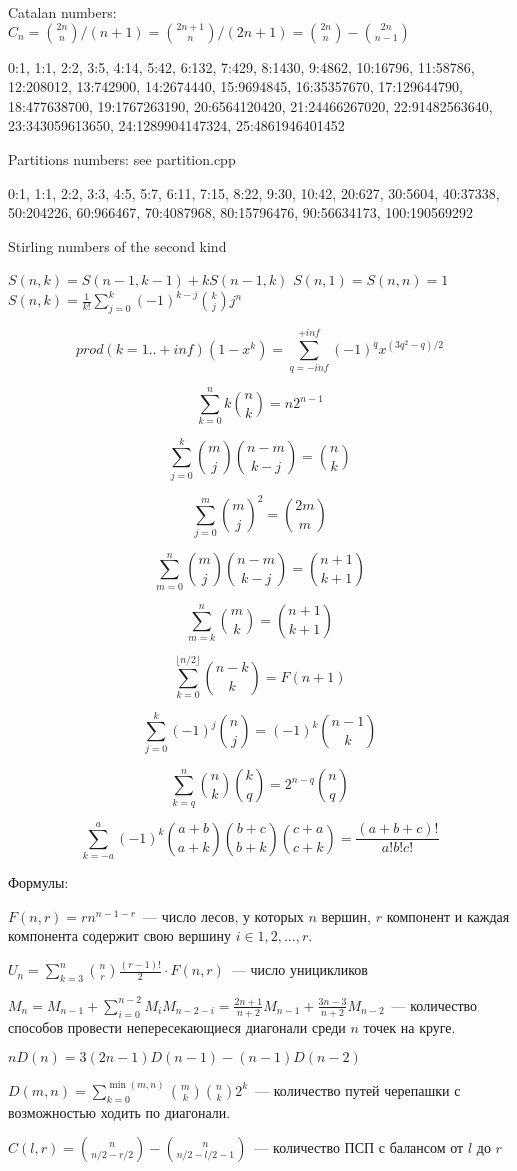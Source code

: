 Catalan numbers:
$C_n = \binom{2n}{n} / (n + 1) = \binom{2n + 1}{n} / (2n + 1) = \binom{2n}{n} - \binom{2n}{n - 1}$

0:1, 1:1, 2:2, 3:5, 4:14, 5:42, 6:132, 7:429, 8:1430, 9:4862,
10:16796, 11:58786, 12:208012, 13:742900, 14:2674440,
15:9694845, 16:35357670, 17:129644790, 18:477638700,
19:1767263190, 20:6564120420, 21:24466267020, 22:91482563640,
23:343059613650, 24:1289904147324, 25:4861946401452

Partitions numbers:
see partition.cpp

0:1, 1:1, 2:2, 3:3, 4:5, 5:7, 6:11, 7:15, 8:22, 9:30, 10:42, 20:627, 30:5604, 40:37338, 50:204226, 60:966467, 70:4087968, 80:15796476, 90:56634173, 100:190569292

Stirling numbers of the second kind

$S(n, k) = S(n - 1, k - 1) + kS(n - 1, k)$
$S(n, 1) = S(n, n) = 1$
$S(n, k) = \frac{1}{k!} \sum_{j=0}^{k}{(-1)^{k - j}\binom{k}{j}j^n}$

$$prod (k=1..+inf) (1-x^k) = \sum_{q=-inf}^{+inf} {(-1)^q x^{(3q^2-q)/2}}$$

$$\sum_{k = 0}^{n}{k \binom{n}{k}} = n 2^{n - 1}$$

$$\sum_{j = 0}^{k}{\binom{m}{j} \binom{n - m}{k - j}} = \binom{n}{k}$$

$$\sum_{j = 0}^{m}{\binom{m}{j}^2} = \binom{2m}{m}$$

$$\sum_{m = 0}^{n}{\binom{m}{j}\binom{n - m}{k - j}} = \binom{n + 1}{k + 1}$$

$$\sum_{m = k}^{n}{\binom{m}{k}} = \binom{n + 1}{k + 1}$$

$$\sum_{k = 0}^{\lfloor n / 2 \rfloor}{\binom{n - k}{k}} = F(n + 1)$$

$$\sum_{j = 0}^{k}{(-1)^{j} \binom{n}{j}} = (-1)^k \binom{n - 1}{k}$$

$$\sum_{k = q}^{n}{\binom{n}{k} \binom{k}{q}} = 2^{n - q}\binom{n}{q}$$

$$\sum_{k =-a}^{a}{(-1)^k \binom{a + b}{a + k} \binom{b + c}{b + k} \binom{c + a}{c + k} } = \frac{(a + b + c)!}{a! b! c!}$$

Формулы:

$F(n, r) = rn^{n - 1 - r}$~--- число лесов, у которых $n$ вершин, $r$ компонент и каждая компонента
содержит свою вершину $i \in 1, 2, \dots , r$. 

$U_n = \sum_{k=3}^{n}{\binom{n}{r} \frac{(r - 1)!}{2} \cdot F(n, r)}$~--- число уницикликов

$M_n = M_{n - 1} + \sum_{i=0}^{n-2}{M_i M_{n - 2 - i}} = \frac{2n + 1}{n + 2}M_{n - 1} + \frac{3n - 3}{n + 2}M_{n - 2}$~--- 
количество способов провести непересекающиеся диагонали среди $n$ точек на круге.

$nD(n) = 3(2n - 1)D(n - 1) - (n - 1)D(n - 2)$

$D(m, n) = \sum_{k=0}^{\min(m, n)}{\binom{m}{k} \binom{n}{k} 2^k}$~--- количество путей черепашки с возможностью ходить по диагонали.

$C(l, r) = \binom{n}{n / 2 - r / 2} - \binom{n}{n / 2 - l / 2 - 1}$~--- количество ПСП с балансом от $l$ до $r$
